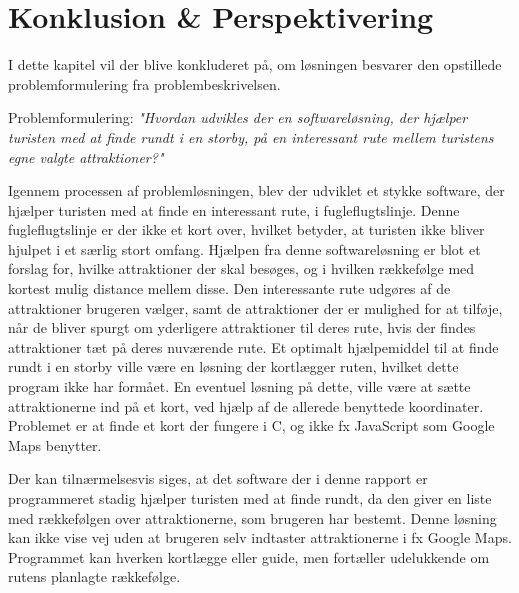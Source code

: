 \chapter{Konklusion \& Perspektivering}
I dette kapitel vil der blive konkluderet på, om løsningen besvarer den opstillede problemformulering fra problembeskrivelsen.

Problemformulering:\newline
\textit{"Hvordan udvikles der en softwareløsning, der hjælper turisten med at finde rundt i en storby, på en interessant rute mellem turistens egne valgte attraktioner?"}

Igennem processen af problemløsningen, blev der udviklet et stykke software, der hjælper turisten med at finde en interessant rute, i fugleflugtslinje. Denne fugleflugtslinje er der ikke et kort over, hvilket betyder, at turisten ikke bliver hjulpet i et særlig stort omfang. Hjælpen fra denne softwareløsning er blot et forslag for, hvilke attraktioner der skal besøges, og i hvilken rækkefølge med kortest mulig distance mellem disse. Den interessante rute udgøres af de attraktioner brugeren vælger, samt de attraktioner der er mulighed for at tilføje, når de bliver spurgt om yderligere attraktioner til deres rute, hvis der findes attraktioner tæt på deres nuværende rute.\newline
Et optimalt hjælpemiddel til at finde rundt i en storby ville være en løsning der kortlægger ruten, hvilket dette program ikke har formået. En eventuel løsning på dette, ville være at sætte attraktionerne ind på et kort, ved hjælp af de allerede benyttede koordinater. Problemet er at finde et kort der fungere i C, og ikke fx JavaScript som Google Maps benytter.

Der kan tilnærmelsesvis siges, at det software der i denne rapport er programmeret stadig hjælper turisten med at finde rundt, da den giver en liste med rækkefølgen over attraktionerne, som brugeren har bestemt. Denne løsning kan ikke vise vej uden at brugeren selv indtaster attraktionerne i fx Google Maps. Programmet kan hverken kortlægge eller guide, men fortæller udelukkende om rutens planlagte rækkefølge.